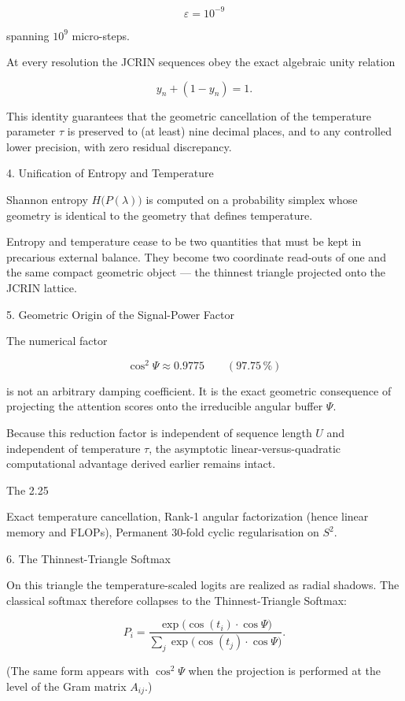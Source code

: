 \[
\varepsilon = 10^{-9}
\]

spanning \(10^9\) micro-steps. 

At every resolution the JCRIN sequences obey the exact algebraic unity relation

\[
y_n + (1 - y_n) = 1.
\]

This identity guarantees that the geometric cancellation of the temperature parameter \(\tau\) is preserved to (at least) nine decimal places, and to any controlled lower precision, with zero residual discrepancy.

4. Unification of Entropy and Temperature

Shannon entropy \(H\bigl(P(\lambda)\bigr)\) is computed on a probability simplex whose geometry is identical to the geometry that defines temperature. 

Entropy and temperature cease to be two quantities that must be kept in precarious external balance. They become two coordinate read-outs of one and the same compact geometric object — the thinnest triangle projected onto the JCRIN lattice.

5. Geometric Origin of the Signal-Power Factor

The numerical factor

\[
\cos^2\Psi \approx 0.9775 \qquad (97.75\,\%)
\]

is not an arbitrary damping coefficient. It is the exact geometric consequence of projecting the attention scores onto the irreducible angular buffer \(\Psi\). 

Because this reduction factor is independent of sequence length \(U\) and independent of temperature \(\tau\), the asymptotic linear-versus-quadratic computational advantage derived earlier remains intact.

The 2.25 %

Exact temperature cancellation, 
Rank-1 angular factorization (hence linear memory and FLOPs), 
Permanent 30-fold cyclic regularisation on \(S^2\).

6. The Thinnest-Triangle Softmax

On this triangle the temperature-scaled logits are realized as radial shadows. The classical softmax therefore collapses to the Thinnest-Triangle Softmax:

\[
P_i = \frac{\exp\bigl(\cos(t_i)\cdot\cos\Psi\bigr)}{\sum_j\exp\bigl(\cos(t_j)\cdot\cos\Psi\bigr)}.
\]

(The same form appears with \(\cos^2\Psi\) when the projection is performed at the level of the Gram matrix \(A_{ij}\).)

